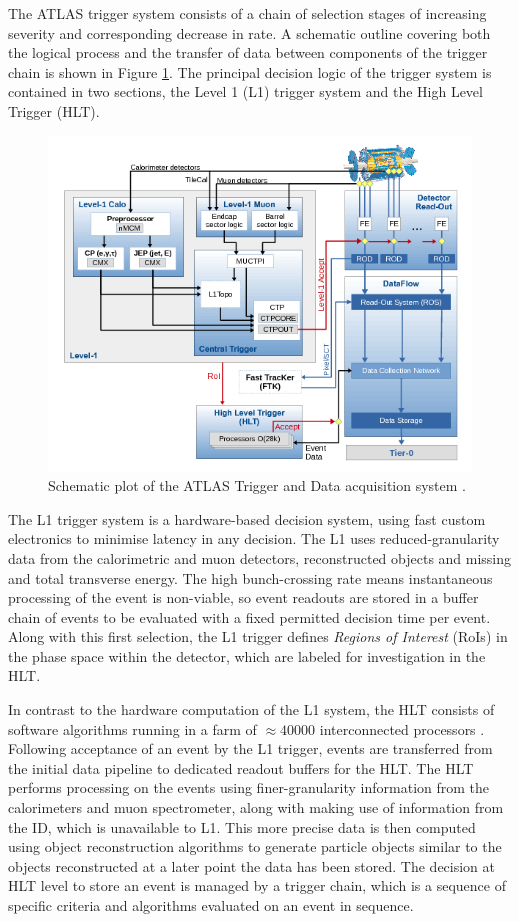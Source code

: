 	The ATLAS trigger system consists of a chain of selection stages of increasing severity and corresponding decrease in rate. A schematic outline covering both the logical process and the transfer of data between components of the trigger chain is shown in Figure \ref{fig:trigschem}. The principal decision logic of the trigger system is contained in two sections, the Level 1 (L1) trigger system and the High Level Trigger (HLT).

	\begin{figure}
		\centering
		\includegraphics[width=0.8\linewidth]{D/FIGS/trigschem}
		\caption[Schematic plot of the ATLAS Trigger and Data acquisition system]{Schematic plot of the ATLAS Trigger and Data acquisition system \cite{trig2015}.}
		\label{fig:trigschem}
		\end{figure}

	The L1 trigger system \cite{L1} is a hardware-based decision system, using fast custom electronics to minimise latency in any decision. The L1 uses reduced-granularity data from the calorimetric and muon detectors, reconstructed objects and missing and total transverse energy. The high bunch-crossing rate means instantaneous processing of the event is non-viable, so event readouts are stored in a buffer chain of events to be evaluated with a fixed permitted decision time per event. Along with this first selection, the L1 trigger defines \textit{Regions of Interest} (RoIs) in the phase space within the detector, which are labeled for investigation in the HLT.

	In contrast to the hardware computation of the L1 system, the HLT consists of software algorithms running in a farm  of $\approx40000$ interconnected processors \cite{trigrun2017}. Following acceptance of an event by the L1 trigger, events are transferred from the initial data pipeline to dedicated readout buffers for the HLT. The HLT performs processing on the events using finer-granularity information from the calorimeters and muon spectrometer, along with making use of information from the ID, which is unavailable to L1. This more precise data is then computed using object reconstruction algorithms to generate particle objects similar to the objects reconstructed at a later point the data has been stored. The decision at HLT level to store an event is managed by a trigger chain, which is a sequence of specific criteria and algorithms evaluated on an event in sequence.

